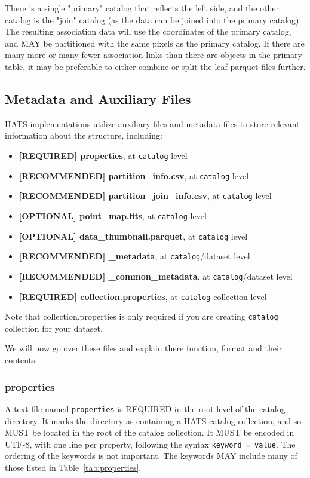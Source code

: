 \documentclass[11pt,a4paper]{ivoa}
\begin{document}
There is a single "primary" catalog that reflects the left side, and the other catalog is the "join" catalog (as the data can be joined into the primary catalog).
The resulting association data will use the coordinates of the primary catalog, and MAY be partitioned with the same pixels as the primary catalog.
If there are many more or many fewer association links than there are objects in the primary table, it may be preferable to either combine or split the leaf parquet files further.

\subsection{Metadata and Auxiliary Files} \label{sec:meta}
HATS implementations utilize auxiliary files and metadata files to store relevant information about the  structure, including:
\begin{itemize}
    \item \textbf{[REQUIRED] properties}, at  \texttt{catalog} level    
    \item \textbf{[RECOMMENDED] partition\_info.csv}, at  \texttt{catalog} level
    \item \textbf{[RECOMMENDED] partition\_join\_info.csv}, at  \texttt{catalog} level
    \item \textbf{[OPTIONAL] point\_map.fits}, at  \texttt{catalog} level
    \item \textbf{[OPTIONAL] data\_thumbnail.parquet}, at  \texttt{catalog} level
    \item \textbf{[RECOMMENDED] \_metadata}, at  \texttt{catalog}/dataset level
    \item \textbf{[RECOMMENDED] \_common\_metadata}, at  \texttt{catalog}/dataset level
    \item \textbf{[REQUIRED] collection.properties}, at  \texttt{catalog} collection level
\end{itemize}
    
Note that collection.properties is only required if you are creating  \texttt{catalog} collection for your dataset. \par 
We will now go over these files and explain there function, format and their contents. 
    
\subsubsection{properties} 

A text file named \texttt{properties} is REQUIRED in the root level of the catalog directory.
It marks the directory as containing a HATS catalog collection, and so MUST be located in the 
root of the catalog collection.
It MUST be encoded in UTF-8, with one line per property, following the syntax \texttt{keyword = value}.
The ordering of the keywords is not important. The keywords MAY include many of those listed in Table~\ref{tab:properties}.
\end{document}
